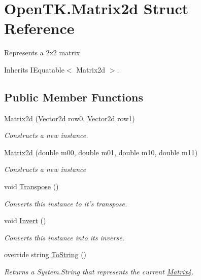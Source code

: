 \hypertarget{struct_open_t_k_1_1_matrix2d}{\section{Open\-T\-K.\-Matrix2d Struct Reference}
\label{struct_open_t_k_1_1_matrix2d}
}


Represents a 2x2 matrix  




Inherits I\-Equatable$<$ Matrix2d $>$.

\subsection*{Public Member Functions}
\begin{DoxyCompactItemize}
\item 
\hyperlink{struct_open_t_k_1_1_matrix2d_ac69c8ddc85874ccc3b2c7a77e77b6476}{Matrix2d} (\hyperlink{struct_open_t_k_1_1_vector2d}{Vector2d} row0, \hyperlink{struct_open_t_k_1_1_vector2d}{Vector2d} row1)
\begin{DoxyCompactList}\small\item\em Constructs a new instance. \end{DoxyCompactList}\item 
\hyperlink{struct_open_t_k_1_1_matrix2d_a57fd6bfa235e5e3e6877fe7c26bac668}{Matrix2d} (double m00, double m01, double m10, double m11)
\begin{DoxyCompactList}\small\item\em Constructs a new instance \end{DoxyCompactList}\item 
void \hyperlink{struct_open_t_k_1_1_matrix2d_a8c315c7439f9628014698d1f027ad368}{Transpose} ()
\begin{DoxyCompactList}\small\item\em Converts this instance to it's transpose. \end{DoxyCompactList}\item 
void \hyperlink{struct_open_t_k_1_1_matrix2d_a89b08243fd3898ef00310906b43e2ff8}{Invert} ()
\begin{DoxyCompactList}\small\item\em Converts this instance into its inverse. \end{DoxyCompactList}\item 
override string \hyperlink{struct_open_t_k_1_1_matrix2d_a6417ccdc1b3ce369b4424f7075ae4086}{To\-String} ()
\begin{DoxyCompactList}\small\item\em Returns a System.\-String that represents the current \hyperlink{struct_open_t_k_1_1_matrix4}{Matrix4}. \end{DoxyCompactList}\item 

\end{DoxyCompactItemize}
